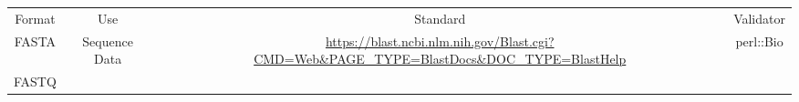 \begin{tabular}{cccc}
{Format} & {Use} & {Standard} & {Validator} \\
FASTA & Sequence Data & \url{https://blast.ncbi.nlm.nih.gov/Blast.cgi?CMD=Web&PAGE_TYPE=BlastDocs&DOC_TYPE=BlastHelp} & perl::Bio\\
FASTQ 
\end{tabular}